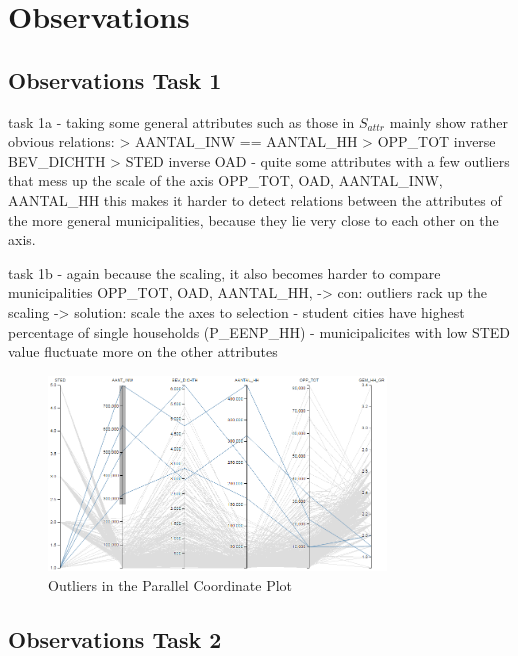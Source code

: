 \section{Observations}

\subsection{Observations Task 1}

task 1a
- taking some general attributes such as those in $S_{attr}$ mainly show rather obvious relations:
    > AANTAL_INW == AANTAL_HH
    > OPP_TOT inverse BEV_DICHTH
    > STED inverse OAD
- quite some attributes with a few outliers that mess up the scale of the axis
OPP_TOT, OAD, AANTAL_INW, AANTAL_HH
    this makes it harder to detect relations between the attributes of the more general municipalities, because they lie very close to each other on the axis.


task 1b
- again because the scaling, it also becomes harder to compare municipalities 
OPP_TOT, OAD, AANTAL_HH,
-> con: outliers rack up the scaling -> solution: scale the axes to selection
- student cities have highest percentage of single households (P_EENP_HH)
- municipalicites with low STED value fluctuate more on the other attributes

\begin{figure}[h!]
    \centering
    \includegraphics[width=0.8\textwidth]{img/para_outliers.png}
    \caption{Outliers in the Parallel Coordinate Plot}
    \label{fig:para_outliers}
\end{figure}

\subsection{Observations Task 2}

